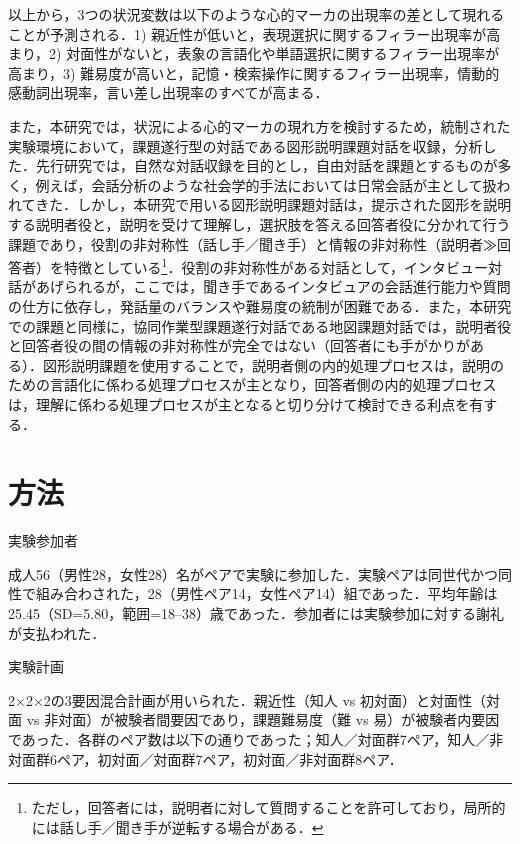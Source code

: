 \documentclass[japanese]{jnlp_1.3a}
\begin{document}
以上から，3つの状況変数は以下のような心的マーカの出現率の差として現れることが予測される．1) 親近性が低いと，表現選択に関するフィラー出現率が高まり，2) 対面性がないと，表象の言語化や単語選択に関するフィラー出現率が高まり，3) 難易度が高いと，記憶・検索操作に関するフィラー出現率，情動的感動詞出現率，言い差し出現率のすべてが高まる．

また，本研究では，状況による心的マーカの現れ方を検討するため，統制された実験環境において，課題遂行型の対話である図形説明課題対話を収録，分析した．先行研究では，自然な対話収録を目的とし，自由対話を課題とするものが多く，例えば，会話分析のような社会学的手法においては日常会話が主として扱われてきた\cite{好井}．しかし，本研究で用いる図形説明課題対話は，提示された図形を説明する説明者役と，説明を受けて理解し，選択肢を答える回答者役に分かれて行う課題であり，役割の非対称性（話し手／聞き手）と情報の非対称性（説明者≫回答者）を特徴としている\footnote{ただし，回答者には，説明者に対して質問することを許可しており，局所的には話し手／聞き手が逆転する場合がある．}．役割の非対称性がある対話として，インタビュー対話があげられるが，ここでは，聞き手であるインタビュアの会話進行能力や質問の仕方に依存し，発話量のバランスや難易度の統制が困難である．また，本研究での課題と同様に，協同作業型課題遂行対話である地図課題対話では，説明者役と回答者役の間の情報の非対称性が完全ではない（回答者にも手がかりがある）．図形説明課題を使用することで，説明者側の内的処理プロセスは，説明のための言語化に係わる処理プロセスが主となり，回答者側の内的処理プロセスは，理解に係わる処理プロセスが主となると切り分けて検討できる利点を有する．

\section{方法}

\noindent 実験参加者

成人56（男性28，女性28）名がペアで実験に参加した．実験ペアは同世代かつ同性で組み合わされた，28（男性ペア14，女性ペア14）組であった．平均年齢は25.45（SD=5.80，範囲=18--38）歳であった．参加者には実験参加に対する謝礼が支払われた．

\vspace{10pt}
\noindent 実験計画

2×2×2の3要因混合計画が用いられた．親近性（知人 vs 初対面）と対面性（対面 vs 非対面）が被験者間要因であり，課題難易度（難 vs 易）が被験者内要因であった．各群のペア数は以下の通りであった；知人／対面群7ペア，知人／非対面群6ペア，初対面／対面群7ペア，初対面／非対面群8ペア．
\end{document}
